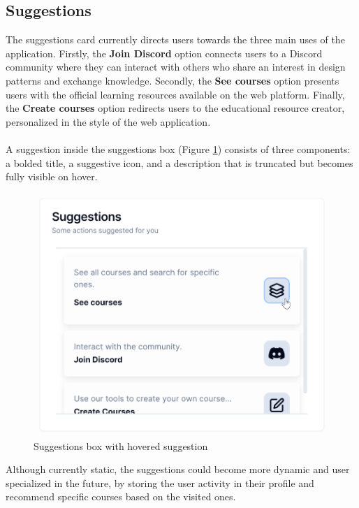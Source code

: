 \subsection{Suggestions}

\noindent The suggestions card currently directs users towards the three main uses of the application. Firstly, the \textbf{Join Discord} option connects users to a Discord community where they can interact with others who share an interest in design patterns and exchange knowledge. Secondly, the \textbf{See courses} option presents users with the official learning resources available on the web platform. Finally, the \textbf{Create courses} option redirects users to the educational resource creator, personalized in the style of the web application.
\\\\
\noindent A suggestion inside the suggestions box (Figure \ref{fig:suggestions-card}) consists of three components: a bolded title, a suggestive icon, and a description that is truncated but becomes fully visible on hover.

\begin{figure}[h]
    \centering
    \includegraphics[scale=0.7]{images/suggestions-card.png}
    \caption{Suggestions box with hovered suggestion}
    \label{fig:suggestions-card}
\end{figure}

\noindent Although currently static, the suggestions could become more dynamic and user specialized in the future, by storing the user activity in their profile and recommend specific courses based on the visited ones.

